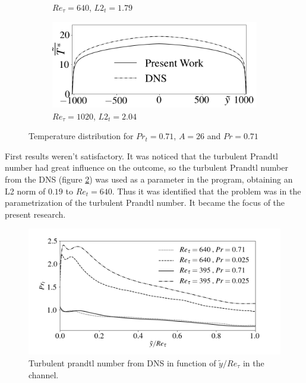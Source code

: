 \documentclass[10pt]{article} %
\begin{document}
\begin{figure}[h!]
\begin{subfigure}[t]{0.49\textwidth}
		\caption{$Re_\tau = 640$, $L2_t = 1.79$}
		\end{subfigure}%
		\begin{subfigure}[t]{0.49\textwidth}
		\centering
 		\includegraphics[angle=0, scale=0.24]{fotos_formatacao_final/Temperature_1000_071_classico}
		\caption{$Re_\tau = 1020$, $L2_t = 2.04$}
		\end{subfigure}%
		\caption{Temperature distribution for $Pr_t = 0.71$, $A = 26$ and $Pr = 0.71$} 
		\label{figuraresultados1}
	\end{figure}	

First results weren't satisfactory. It was noticed that the turbulent Prandtl number had great influence on the outcome, so the turbulent Prandtl number from the DNS (figure \ref{figure5}) was used as a parameter in the program, obtaining an L2 norm of $ 0.19 $ to $ Re_t = 640 $. Thus it was identified that the problem was in the parametrization of the turbulent Prandtl number. It became the focus of the present research.

\begin{figure}[h!]
	\centering
	\includegraphics[angle=0, scale=0.45]{fotos_formatacao_final/DNS_PRt}
	\caption{Turbulent prandtl number from DNS in function of $ \tilde{y}/Re_\tau $ in the channel.}
	\label{figure5}
\end{figure}
\end{document}

